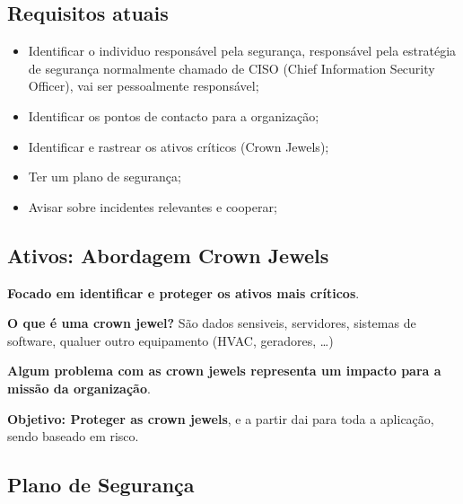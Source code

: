 \documentclass{article}
\begin{document}
\subsection{Requisitos atuais}
\begin{flushleft}
  \begin{itemize}
    \item Identificar o individuo responsável pela segurança, responsável
    pela estratégia de segurança normalmente chamado de CISO (Chief Information Security Officer),
    vai ser pessoalmente responsável;
    \item Identificar os pontos de contacto para a organização;
    \item Identificar e rastrear os ativos críticos (Crown Jewels);
    \item Ter um plano de segurança;
    \item Avisar sobre incidentes relevantes e cooperar;
  \end{itemize}
\end{flushleft}

\subsection{Ativos: Abordagem Crown Jewels}

\begin{flushleft}
  \textbf{Focado em identificar e proteger os ativos mais críticos}.

  \vspace{2mm}

  \textbf{O que é uma crown jewel?} São dados sensiveis, servidores, sistemas
  de software, qualuer outro equipamento (HVAC, geradores, \dots)

  \vspace{2mm}

  \textbf{Algum problema com as crown jewels representa um impacto para a
  missão da organização}.

  \vspace{2mm}

  \textbf{Objetivo: Proteger as crown jewels}, e a partir dai para toda a aplicação,
  sendo baseado em risco.
\end{flushleft}

\pagebreak

\subsection{Plano de Segurança}
\end{document}
